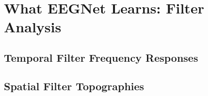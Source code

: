 \section{What EEGNet Learns: Filter Analysis}
\label{sec:results_filters}



\subsection{Temporal Filter Frequency Responses}
\label{subsec:results_temporal_filters}

%
%
%
%
%
%
%
%


\subsection{Spatial Filter Topographies}
\label{subsec:results_spatial_filters}

%
%
%
%
%
%
%
%


